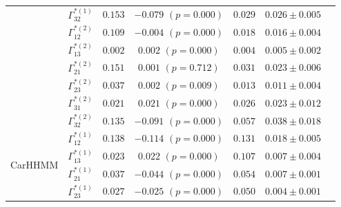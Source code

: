 \documentclass{article}
\begin{document}
\begin{center}
{\begin{tabular}{ccccccc}
                             & $\Gamma^{*(1)}_{32}$          & $0.153$                         & $-0.079$ $(p=0.000)$        & $0.029$                           & $0.026 \pm 0.005$                             \\
                             & $\Gamma^{*(2)}_{12}$          & $0.109$                         & $-0.004$ $(p=0.000)$        & $0.018$                           & $0.016 \pm 0.004$                             \\
                             & $\Gamma^{*(2)}_{13}$          & $0.002$                         & $0.002$ $(p=0.000)$        & $0.004$                           & $0.005 \pm 0.002$                             \\
                             & $\Gamma^{*(2)}_{21}$          & $0.151$                         & $0.001$ $(p=0.712)$        & $0.031$                           & $0.023 \pm 0.006$                             \\
                             & $\Gamma^{*(2)}_{23}$          & $0.037$                         & $0.002$ $(p=0.009)$        & $0.013$                           & $0.011 \pm 0.004$                             \\
                             & $\Gamma^{*(2)}_{31}$          & $0.021$                         & $0.021$ $(p=0.000)$        & $0.026$                           & $0.023 \pm 0.012$                             \\
                             & $\Gamma^{*(2)}_{32}$          & $0.135$                         & $-0.091$ $(p=0.000)$        & $0.057$                           & $0.038 \pm 0.018$                             \\ \hline
\multirow{12}{*}{CarHHMM}    & $\Gamma^{*(1)}_{12}$          & $0.138$                         & $-0.114$ $(p=0.000)$        & $0.131$                           & $0.018 \pm 0.005$                             \\
                             & $\Gamma^{*(1)}_{13}$          & $0.023$                         & $0.022$ $(p=0.000)$        & $0.107$                           & $0.007 \pm 0.004$                             \\
                             & $\Gamma^{*(1)}_{21}$          & $0.037$                         & $-0.044$ $(p=0.000)$        & $0.054$                           & $0.007 \pm 0.001$                             \\
                             & $\Gamma^{*(1)}_{23}$          & $0.027$                         & $-0.025$ $(p=0.000)$        & $0.050$                           & $0.004 \pm 0.001$                             \\

\end{tabular}}
\end{center}
\end{document}
